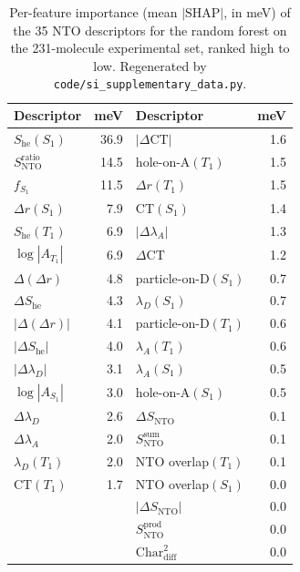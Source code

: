 \documentclass[twoside,twocolumn,9pt]{extarticle}
\begin{document}
\begin{table}[htbp]
  \centering
  \caption{Per-feature importance (mean $|\text{SHAP}|$, in meV) of the \num{35}
    NTO descriptors for the random forest on the \num{231}-molecule experimental
    set, ranked high to low. Regenerated by
    \texttt{code/si\_supplementary\_data.py}.}
  \label{tab:shap}
  \footnotesize
  \begin{tabular}{lr@{\hskip 2em}lr}
    \toprule
    Descriptor & meV & Descriptor & meV \\
    \midrule
    $S_\text{he}(S_1)$        & 36.9 & $|\Delta\text{CT}|$            & 1.6 \\
    $S_\text{NTO}^{\text{ratio}}$ & 14.5 & hole-on-A$(T_1)$          & 1.5 \\
    $f_{S_1}$                 & 11.5 & $\Delta r(T_1)$               & 1.5 \\
    $\Delta r(S_1)$           &  7.9 & $\text{CT}(S_1)$              & 1.4 \\
    $S_\text{he}(T_1)$        &  6.9 & $|\Delta\lambda_A|$          & 1.3 \\
    $\log|A_{T_1}|$           &  6.9 & $\Delta\text{CT}$            & 1.2 \\
    $\Delta(\Delta r)$        &  4.8 & particle-on-D$(S_1)$         & 0.7 \\
    $\Delta S_\text{he}$      &  4.3 & $\lambda_D(S_1)$             & 0.7 \\
    $|\Delta(\Delta r)|$      &  4.1 & particle-on-D$(T_1)$         & 0.6 \\
    $|\Delta S_\text{he}|$    &  4.0 & $\lambda_A(T_1)$             & 0.6 \\
    $|\Delta\lambda_D|$       &  3.1 & $\lambda_A(S_1)$             & 0.5 \\
    $\log|A_{S_1}|$           &  3.0 & hole-on-A$(S_1)$             & 0.5 \\
    $\Delta\lambda_D$         &  2.6 & $\Delta S_\text{NTO}$        & 0.1 \\
    $\Delta\lambda_A$         &  2.0 & $S_\text{NTO}^{\text{sum}}$  & 0.1 \\
    $\lambda_D(T_1)$          &  2.0 & NTO overlap$(T_1)$           & 0.1 \\
    $\text{CT}(T_1)$          &  1.7 & NTO overlap$(S_1)$           & 0.0 \\
    \multicolumn{2}{l}{} & $|\Delta S_\text{NTO}|$         & 0.0 \\
    \multicolumn{2}{l}{} & $S_\text{NTO}^{\text{prod}}$    & 0.0 \\
    \multicolumn{2}{l}{} & $\text{Char}_\text{diff}^2$    & 0.0 \\
    \bottomrule
  \end{tabular}
\end{table}
\end{document}
